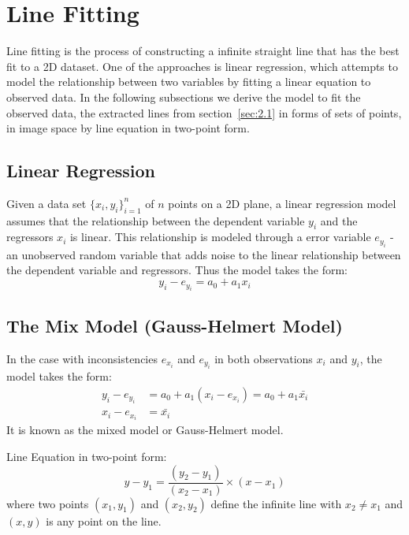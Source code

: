 \section{Line Fitting}
\label{sec:2.3.LineFitting}

Line fitting is the process of constructing a infinite straight line that has the best fit to a 2D dataset. One of the approaches is linear regression, which attempts to model the relationship between two variables by fitting a linear equation to observed data. In the following subsections we derive the model to fit the observed data, the extracted lines from section~\ref{sec:2.1} in forms of sets of points, in image space by line equation in two-point form.

\subsection{Linear Regression}
\label{subsec:2.3.1}
Given a data set $\{x_i,y_i\}^n_{i=1}$ of $n$ points on a 2D plane, a linear regression model assumes that the relationship between the dependent variable $y_i$ and the regressors $x_i$ is linear. This relationship is modeled through a error variable $e_{y_i}$ -an unobserved random variable that adds noise to the linear relationship between the dependent variable and regressors.
Thus the model takes the form:
\begin{equation} %
y_i - e_{y_i} = a_0 + a_1x_i
\end{equation}

\subsection{The Mix Model (Gauss-Helmert Model)}
\label{subsec:2.3.2}

In the case with inconsistencies $e_{x_i}$ and $e_{y_i}$ in both observations $x_i$ and $y_i$, the model takes the form:
\begin{equation} %
\begin{split}
y_i - e_{y_i} &= a_0 + a_1(x_i-e_{x_i}) = a_0 + a_1\bar{x_i}\\
x_i-e_{x_i} &= \bar{x_i}
\end{split}
\end{equation}
It is known as the mixed model or Gauss-Helmert model.

Line Equation in two-point form:
\begin{equation} %
y-y_1 = \dfrac{(y_2-y_1)}{(x_2-x_1)}\times(x-x_1)
\end{equation}
where two points $(x_1,y_1)$ and $(x_2,y_2)$ define the infinite line with $x_2\neq x_1$ and $(x,y)$ is any point on the line.





